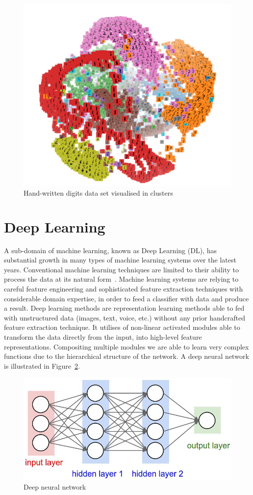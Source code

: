 \begin{figure}[h!]
    \centering  
    \includegraphics[width=.5\textwidth]{figures/chap3/ml/clusters}
    \caption{Hand-written digits data set visualised in clusters}
    \label{c3:clustering}
\end{figure}

\section{Deep Learning}

A sub-domain of machine learning, known as Deep Learning (DL), has substantial growth in many types of machine learning systems over the latest years. Conventional machine learning techniques are limited to their ability to process the data at its natural form~\cite{lecun2015deep}. Machine learning systems are relying to careful feature engineering and sophisticated feature extraction techniques with considerable domain expertise, in order to feed a classifier with data and produce a result.
Deep learning methods are representation learning methods able to fed with unstructured data (images, text, voice, etc.) without any prior handcrafted feature extraction technique. It utilises of non-linear activated modules able to transform the data directly from the input, into high-level feature representations. Compositing multiple modules we are able to learn very complex functions due to the hierarchical structure of the network. A deep neural network is illustrated in Figure~\ref{c3:dl}.

\begin{figure}[h!]
    \centering  
    \includegraphics[width=.6\textwidth]{figures/chap3/ml/dl}
    \caption{Deep neural network}
    \label{c3:dl}
\end{figure}

